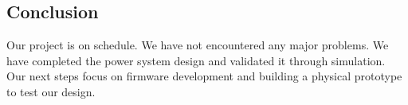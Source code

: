 \documentclass[a4paper,11pt]{article}%
\begin{document}
\subsection{Conclusion}

Our project is on schedule. We have not encountered any major problems. We have completed the power system design and validated it through simulation. Our next steps focus on firmware development and building a physical prototype to test our design.







\end{document}
